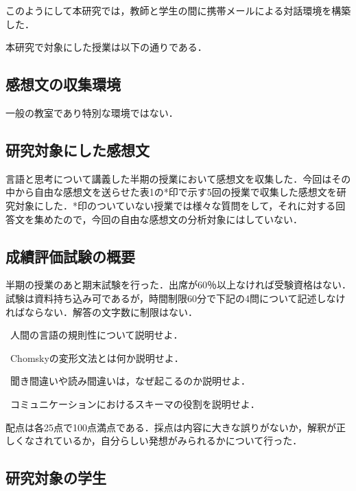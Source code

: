 \documentclass[japanese]{jnlp_1.3a}
\begin{document}
このようにして本研究では，教師と学生の間に携帯メールによる対話環境を構築した．

本研究で対象にした授業は以下の通りである．

\subsection{感想文の収集環境}

一般の教室であり特別な環境ではない．

\subsection{研究対象にした感想文}

言語と思考について講義した半期の授業において感想文を収集した．今回はその中から自由な感想文を送らせた表1の*印で示す5回の授業で収集した感想文を研究対象にした．*印のついていない授業では様々な質問をして，それに対する回答文を集めたので，今回の自由な感想文の分析対象にはしていない．

\begin{table}[t]
\begin{center}

\label{table1}
\end{center}
\end{table}

\subsection{成績評価試験の概要}

半期の授業のあと期末試験を行った．出席が60％以上なければ受験資格はない．試験は資料持ち込み可であるが，時間制限60分で下記の4問について記述しなければならない．解答の文字数に制限はない．

\textbullet~人間の言語の規則性について説明せよ．

\textbullet~Chomskyの変形文法とは何か説明せよ．

\textbullet~聞き間違いや読み間違いは，なぜ起こるのか説明せよ．

\textbullet~コミュニケーションにおけるスキーマの役割を説明せよ．

配点は各25点で100点満点である．採点は内容に大きな誤りがないか，解釈が正しくなされているか，自分らしい発想がみられるかについて行った．

\subsection{研究対象の学生} 
\end{document}
